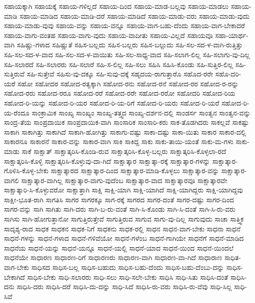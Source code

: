 {ಸಹಾಯಕ್ಕಾಗಿ
ಸಹಾಯಕ್ಕೆ
ಸಹಾಯ-ಗಳಿಲ್ಲದೆ
ಸಹಾಯ-ದಿಂದ
ಸಹಾಯ-ಮಾಡ-ಬಲ್ಲವು
ಸಹಾಯ-ಮಾಡಲು
ಸಹಾಯ-ಮಾಡಿ
ಸಹಾಯ-ಮಾಡಿದ
ಸಹಾಯ-ಮಾಡಿ-ದರೆ
ಸಹಾಯ-ಮಾಡಿದೆ
ಸಹಾಯ-ಮಾಡು-ವರು
ಸಹಾಯ-ಮಾಡು-ವುದು
ಸಹಾಯ-ಮಾಡು-ವುವು
ಸಹಾಯ-ವನ್ನು
ಸಹಾಯ-ವನ್ನೂ
ಸಹಾಯ-ವಾಗ-ಬಹು-ದೆಂದು
ಸಹಾಯ-ವಾಗ-ಬೇಕಾದರೆ
ಸಹಾಯ-ವಾಗು-ವಂತಹ
ಸಹಾಯ-ವಾಗು-ವುದು
ಸಹಾಯ-ವಾದೀತು
ಸಹಾಯ-ವಿಲ್ಲದೆ
ಸಹಾಯವೂ
ಸಹಾ-ಯಾರ್ಥ-ವಾಗಿ
ಸಹಿಷ್ಣು-ಗಳಾದ
ಸಹಿಷ್ಣುತೆ
ಸಹಿಸ-ಬಲ್ಲದು
ಸಹಿಸ-ಬಲ್ಲರು
ಸಹಿಸ-ಬಲ್ಲುದು
ಸಹಿ-ಸಲ-ಸದ-ಳ-ವಾಗಿ-ರುತ್ತಿತ್ತು
ಸಹಿ-ಸಲ-ಸದ-ಳ-ವಾದ
ಸಹಿ-ಸಲ-ಸದ-ಳ-ವಾಯಿತು
ಸಹಿ-ಸಲ-ಸಾಧ್ಯ-ವಾದ
ಸಹಿ-ಸಲಾಗ-ಲಿಲ್ಲ
ಸಹಿ-ಸಲಾಗು-ವು-ದಿಲ್ಲ
ಸಹಿ-ಸಲಾರದೆ
ಸಹಿ-ಸಲಾರರು
ಸಹಿ-ಸಲಾರೆ
ಸಹಿ-ಸ-ಲಿಲ್ಲ
ಸಹಿ-ಸಲು
ಸಹಿಸಿ
ಸಹಿಸಿ-ಕೊಂಡು
ಸಹಿ-ಸುತ್ತಿರ-ಲಿಲ್ಲ
ಸಹಿ-ಸುತ್ತಿರುವೆ
ಸಹಿ-ಸುತ್ತೇವೆ
ಸಹಿಸು-ವು-ದಕ್ಕೂ
ಸಹಿ-ಸುವು-ದಕ್ಕೆ
ಸಹೃದಯ-ರಾಗುತ್ತಾರೊ
ಸಹೊದ-ರರೇ
ಸಹೊ-ದರಿ-ಯರೆ
ಸಹೋ
ಸಹೋದರ
ಸಹೋದ-ರತ್ವಕ್ಕಾಗಿ
ಸಹೋದ-ರನು
ಸಹೋದ-ರನೆ
ಸಹೋದ-ರರ
ಸಹೋದ-ರ-ರನ್ನು
ಸಹೋದ-ರರು
ಸಹೋದ-ರರೂ
ಸಹೋದ-ರರೆ
ಸಹೋದ-ರರೇ
ಸಹೋದ-ರರೋ
ಸಹೋದರಿ
ಸಹೋದ-ರಿಯ
ಸಹೋದ-ರಿ-ಯನ್ನು
ಸಹೋದ-ರಿ-ಯರ
ಸಹೋದ-ರಿ-ಯ-ರಿಗೆ
ಸಹೋದ-ರಿ-ಯರು
ಸಹೋದ-ರಿ-ಯರೆ
ಸಹೋದ-ರಿ-ಯ-ರೆಂದೂ
ಸಾಂಕ್ರಾಮಿಕ
ಸಾಂಖ್ಯ
ಸಾಂಖ್ಯಂ
ಸಾಂಖ್ಯ-ತತ್ತ್ವದ
ಸಾಂಖ್ಯ-ದರ್ಶನ-ದಲ್ಲಿ
ಸಾಂಡರ್ಸ
ಸಾಂತ್ವನ
ಸಾಂತ್ವನ-ವನ್ನು
ಸಾಂದ್ರ-ತೆಯ
ಸಾಂಪ್ರದಾಯಿಕ
ಸಾಂಪ್ರದಾಯಿಕ-ವಾಗಿ
ಸಾಂಸಾರಿಕ
ಸಾಂಸಾರಿ-ಕರು
ಸಾಕ-ತೊಡಗಿದರು
ಸಾಕಲ್ಲವೆ
ಸಾಕಷ್ಟು
ಸಾಕಾಗಿ
ಸಾಕಾಗಿತ್ತು
ಸಾಕಾಗಿದೆ
ಸಾಕಾಗಿ-ಹೋಗಿತ್ತು
ಸಾಕಾಗು-ವಷ್ಟು
ಸಾಕಾ-ದಷ್ಟು
ಸಾಕಾ-ಯಿತು
ಸಾಕಾರ
ಸಾಕಾರ-ದಲ್ಲಿ
ಸಾಕಾರನೂ
ಸಾಕಾರನೆ
ಸಾಕಾರ-ವನ್ನು
ಸಾಕಾರ-ವಾಗಿ
ಸಾಕಿ
ಸಾಕಿದ್ದ
ಸಾಕು
ಸಾಕು-ತಾಯಿ-ಯಂತೆ
ಸಾಕು-ಮ-ಗಳು
ಸಾಕು-ಮಾಡು
ಸಾಕೆ
ಸಾಕ್ಷಾತ್
ಸಾಕ್ಷಾತ್ಕರಿಸಿ-ಕೊಂಡಿ-ರುವ
ಸಾಕ್ಷಾತ್ಕರಿಸಿ-ಕೊಳ್ಳ-ಬಲ್ಲರು
ಸಾಕ್ಷಾತ್ಕರಿಸಿ-ಕೊಳ್ಳಲಾ-ರದೆ
ಸಾಕ್ಷಾತ್ಕರಿಸಿ-ಕೊಳ್ಳಿ
ಸಾಕ್ಷಾತ್ಕರಿಸಿ-ಕೊಳ್ಳುವು-ದಾ-ಗಿದೆ
ಸಾಕ್ಷಾತ್ಕಾರ
ಸಾಕ್ಷಾತ್ಕಾ-ರಕ್ಕೆ
ಸಾಕ್ಷಾತ್ಕಾರ-ಗಳನ್ನು
ಸಾಕ್ಷಾತ್ಕಾರ-ಗೊಳಿಸಿ-ಕೊಳ್ಳ-ಬೇಕು
ಸಾಕ್ಷಾತ್ಕಾರದ
ಸಾಕ್ಷಾತ್ಕಾರ-ದಿಂದ
ಸಾಕ್ಷಾತ್ಕಾರ-ಮಾಡಿ-ಕೊಳ್ಳಲು
ಸಾಕ್ಷಾತ್ಕಾರ-ವನ್ನು
ಸಾಕ್ಷಾತ್ಕಾರ-ವಾಗಲಿ
ಸಾಕ್ಷಾತ್ಕಾರ-ವಾಗಿಲ್ಲ
ಸಾಕ್ಷಾತ್ಕಾರ-ವಾಗು-ವುದೆಂಬ
ಸಾಕ್ಷಾತ್ಕಾರ-ವಾದ
ಸಾಕ್ಷಾತ್ಕಾರವೂ
ಸಾಕ್ಷಾತ್ಕಾರವೇ
ಸಾಕ್ಷಾತ್ಕಾರಿ-ಸಿ-ಕೊಳ್ಳುವರೋ
ಸಾಕ್ಷಾತ್ತಾಗಿ
ಸಾಕ್ಷಿ
ಸಾಕ್ಷಿ-ಯಾಗಿ
ಸಾಕ್ಷಿ-ಯಾಗಿದೆ
ಸಾಕ್ಷಿ-ಯಾಗಿದ್ದರು
ಸಾಕ್ಷಿ-ಯಾಗಿದ್ದವು
ಸಾಕ್ಷೀ-ಭೂತ-ರಾಗಿ
ಸಾಗತಿಸಿ
ಸಾಗರ
ಸಾಗರಕ್ಕೂ
ಸಾಗ-ರಕ್ಕೆ
ಸಾಗರದ
ಸಾಗರ-ದಂತೆ
ಸಾಗರ-ದಷ್ಟು
ಸಾಗರ-ದಿಂದ
ಸಾಗರ-ವನ್ನು
ಸಾಗಿ
ಸಾಗಿತು
ಸಾಗಿ-ದರು
ಸಾಗಿ-ಬ-ರು-ವಂತೆ
ಸಾಗಿ-ಸಿ-ಕೊಂಡು
ಸಾಗಿ-ಸಿ-ದಂತೆ
ಸಾಗಿ-ಸಿ-ರು-ವರು
ಸಾಗಿಸು
ಸಾಗಿ-ಹೋಗುತ್ತಾನೋ
ಸಾಗುತ್ತಿರುತ್ತೇವೆ
ಸಾಗುತ್ತಿರುವ
ಸಾಗುವ
ಸಾಗು-ವು-ದಿಲ್ಲ
ಸಾಗುವುದು
ಸಾಚಾ
ಸಾತ್ತ್ವಿಕ
ಸಾದೃಶ್ಯ-ರಾದ
ಸಾಧಕ
ಸಾಧಕನ
ಸಾಧಕ-ನಿಗೆ
ಸಾಧಕನು
ಸಾಧಕ-ರಲ್ಲಿ
ಸಾಧನ
ಸಾಧನ-ವಾಗ-ಬೇಕು
ಸಾಧನಾ
ಸಾಧನೆ
ಸಾಧನೆ-ಗಳನ್ನು
ಸಾಧನೆ-ಗಳಾದ
ಸಾಧನೆ-ಗಳಿವೆಯೋ
ಸಾಧನೆ-ಗಳೆಂಬ
ಸಾಧನೆ-ಗಾಗಿಯೇ
ಸಾಧನೆಗೆ
ಸಾಧನೆ-ಮಾಡಿದ
ಸಾಧನೆಯ
ಸಾಧನೆ-ಯನ್ನು
ಸಾಧನೆ-ಯನ್ನೂ
ಸಾಧನೆ-ಯಲ್ಲಿ
ಸಾಧನೆ-ಯಾದ
ಸಾಧನೆ-ಯಿಂದ
ಸಾಧನೆ-ಯಿಂದಲೆ
ಸಾಧನೆಯೇ
ಸಾಧಾರಣ
ಸಾಧಾರಣ-ರಿಗೆ
ಸಾಧಾರಣರು
ಸಾಧಾರಣ-ವಾಗಿ
ಸಾಧಾರಣ-ವಾ-ಗಿದೆ
ಸಾಧಾರಾಣ
ಸಾಧಿತ-ವಾಗ-ಬೇಕು
ಸಾಧಿಸದ
ಸಾಧಿಸ-ಬಲ್ಲ
ಸಾಧಿಸ-ಬಹುದು
ಸಾಧಿಸ-ಬಹು-ದೆಂದು
ಸಾಧಿಸ-ಬಹು-ದೆಂಬು-ದನ್ನು
ಸಾಧಿಸ-ಬೇಕಾಗಿದೆ
ಸಾಧಿಸ-ಬೇಕು
ಸಾಧಿ-ಸಲಾರರು
ಸಾಧಿ-ಸಲು
ಸಾಧಿ-ಸಲೇ-ಬೇಕು
ಸಾಧಿಸಿ
ಸಾಧಿ-ಸಿತು
ಸಾಧಿಸಿ-ದಂತೆ
ಸಾಧಿಸಿ-ದನು
ಸಾಧಿಸಿ-ದರು
ಸಾಧಿಸಿ-ದರೆ
ಸಾಧಿಸಿ-ದು-ದನ್ನು
ಸಾಧಿ-ಸಿದೆ
ಸಾಧಿಸಿ-ರು-ವರು
ಸಾಧಿಸಿ-ರು-ವೆವು
ಸಾಧಿ-ಸಿಲ್ಲ
ಸಾಧಿ-ಸಿವೆ
}
